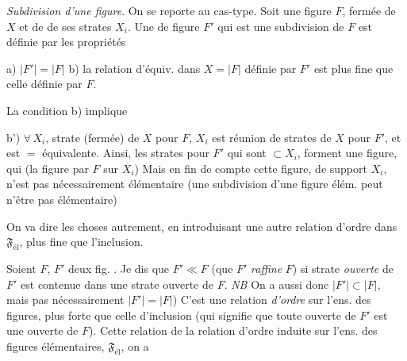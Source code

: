 \documentclass[11pt,a4paper]{article}
\begin{document}
\emph{Subdivision d'une figure}. \struck{\ill{}} On se reporte au cas-type. Soit une figure $F$, fermée de $X$ et de \struck{\ill{}} de ses strates $X_i$. Une  de figure $F'$ qui est une subdivision de $F$ est \struck{\ill{}} définie par les propriétés

a) $|F'| = |F|$ \qquad b) la relation d'équiv. dans $X = |F|$ définie par $F'$ est plus fine que celle définie par $F$.

La condition b) implique

b') $\forall\, X_i$, strate (fermée) de $X$ pour $F$, $X_i$ est réunion de strates de $X$ pour $F'$, et  \struck{\ill{}} est $=$ équivalente. Ainsi, les strates pour $F'$ qui sont $\subset X_i$, forment une figure, qui   \struck{\ill{}} (la figure  par $F$ sur $X_i$) Mais en fin de compte cette figure, de support $X_i$, n'est pas nécessairement élémentaire (une subdivision d'une figure élém. peut n'être pas élémentaire)

On va dire les choses autrement, en introduisant une autre relation d'ordre dans $\mathfrak{F}_{\mathrm{él}}$, plus fine que l'inclusion. \struck{\ill{}}

Soient $F$, $F'$ deux fig. . Je dis que $F' \ll F$ (que $F'$ \emph{raffine} $F$) si   strate \emph{ouverte} de $F'$ est contenue dans une  strate ouverte de $F$. \emph{NB} On a aussi \struck{\ill{}} donc $|F'| \subset |F|$, mais pas nécessairement $|F'| = |F|$) C'est une relation \emph{d'ordre} sur l'ens. des figures, plus forte que celle d'inclusion (qui signifie \struck{\ill{}} que toute   ouverte de $F'$ est une   ouverte de $F$). Cette relation \ill{} \ill{} \struck{\ill{}} \ill{}  de la relation d'ordre induite sur l'ens. des figures élémentaires, $\mathfrak{F}_{\mathrm{él}}$, \ill{} on a
\end{document}
